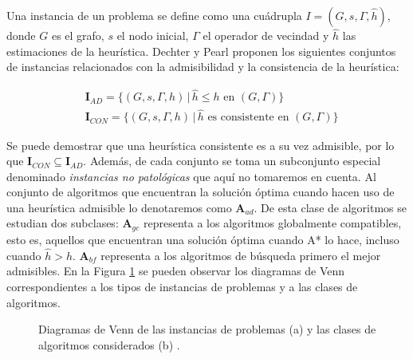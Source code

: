 \documentclass[a4paper,12pt]{article}
\begin{document}
Una instancia de un problema se define como una cuádrupla $I=(G, s, \Gamma, \hat{h})$, donde $G$ es el grafo, $s$ el nodo inicial, $\Gamma$ el operador de vecindad y $\hat{h}$ las estimaciones de la heurística. Dechter y Pearl proponen los siguientes conjuntos de instancias relacionados con la admisibilidad y la consistencia de la heurística:

\begin{equation}
\begin{split}
& \textbf{I}_{AD} = \{(G,s,\Gamma,h)\,\vert\, \hat{h} \leq h\text{ en }(G, \Gamma) \} \\
& \textbf{I}_{CON} = \{(G,s,\Gamma,h)\,\vert\, \hat{h}\text{ es consistente en }(G, \Gamma) \}
\end{split}
\end{equation}

Se puede demostrar que una heurística consistente es a su vez admisible, por lo que $\textbf{I}_{CON} \subseteq \textbf{I}_{AD}$. Además, de cada conjunto se toma un subconjunto especial denominado \textit{instancias no patológicas} que aquí no tomaremos en cuenta. Al conjunto de algoritmos que encuentran la solución óptima cuando hacen uso de una heurística admisible lo denotaremos como \textbf{A}$_{ad}$. De esta clase de algoritmos se estudian dos subclases: \textbf{A}$_{gc}$ representa a los algoritmos globalmente compatibles, esto es, aquellos que encuentran una solución óptima cuando A* lo hace, incluso cuando $\hat{h} > h$. \textbf{A}$_{bf}$ representa a los algoritmos de búsqueda primero el mejor admisibles. En la Figura \ref{fig:venn} se pueden observar los diagramas de Venn correspondientes a los tipos de instancias de problemas y a las clases de algoritmos.

\begin{figure}[H]
    \centering
    \begin{subfigure}[h]{.45\textwidth}
        \centering
        
        \caption{}
    \end{subfigure}
    \hfill
    \begin{subfigure}[h]{.45\textwidth}
        \centering
        
        \caption{}
    \end{subfigure}
    \caption{Diagramas de Venn de las instancias de problemas (a) y las clases de algoritmos considerados (b) \cite{dechter1985generalized}.}
    \label{fig:venn}
\end{figure}
\end{document}
